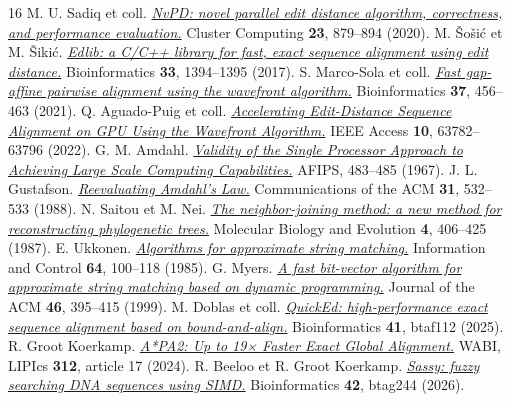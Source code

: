 \begin{thebibliography}{16}
 M. U. Sadiq et coll. \href{https://doi.org/10.1007/s10586-019-02962-w}{\emph{NvPD: novel parallel edit distance algorithm, correctness, and performance evaluation.}} Cluster Computing \textbf{23}, 879--894 (2020).
 M. Šošić et M. Šikić. \href{https://doi.org/10.1093/bioinformatics/btw753}{\emph{Edlib: a C/C++ library for fast, exact sequence alignment using edit distance.}} Bioinformatics \textbf{33}, 1394--1395 (2017).
 S. Marco-Sola et coll. \href{https://doi.org/10.1093/bioinformatics/btaa777}{\emph{Fast gap-affine pairwise alignment using the wavefront algorithm.}} Bioinformatics \textbf{37}, 456--463 (2021).
 Q. Aguado-Puig et coll. \href{https://doi.org/10.1109/ACCESS.2022.3182714}{\emph{Accelerating Edit-Distance Sequence Alignment on GPU Using the Wavefront Algorithm.}} IEEE Access \textbf{10}, 63782--63796 (2022).
 G. M. Amdahl. \href{https://doi.org/10.1145/1465482.1465560}{\emph{Validity of the Single Processor Approach to Achieving Large Scale Computing Capabilities.}} AFIPS, 483--485 (1967).
 J. L. Gustafson. \href{https://doi.org/10.1145/42411.42415}{\emph{Reevaluating Amdahl's Law.}} Communications of the ACM \textbf{31}, 532--533 (1988).
 N. Saitou et M. Nei. \href{https://doi.org/10.1093/oxfordjournals.molbev.a040454}{\emph{The neighbor-joining method: a new method for reconstructing phylogenetic trees.}} Molecular Biology and Evolution \textbf{4}, 406--425 (1987).
 E. Ukkonen. \href{https://doi.org/10.1016/S0019-9958(85)80046-2}{\emph{Algorithms for approximate string matching.}} Information and Control \textbf{64}, 100--118 (1985).
 G. Myers. \href{https://doi.org/10.1145/316542.316550}{\emph{A fast bit-vector algorithm for approximate string matching based on dynamic programming.}} Journal of the ACM \textbf{46}, 395--415 (1999).
 M. Doblas et coll. \href{https://doi.org/10.1093/bioinformatics/btaf112}{\emph{QuickEd: high-performance exact sequence alignment based on bound-and-align.}} Bioinformatics \textbf{41}, btaf112 (2025).
 R. Groot Koerkamp. \href{https://doi.org/10.4230/LIPIcs.WABI.2024.17}{\emph{A*PA2: Up to 19× Faster Exact Global Alignment.}} WABI, LIPIcs \textbf{312}, article 17 (2024).
 R. Beeloo et R. Groot Koerkamp. \href{https://doi.org/10.1093/bioinformatics/btag244}{\emph{Sassy: fuzzy searching DNA sequences using SIMD.}} Bioinformatics \textbf{42}, btag244 (2026).

\end{thebibliography}
